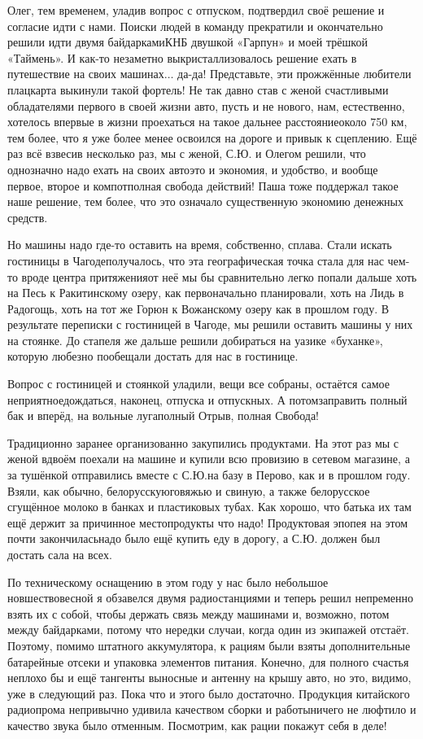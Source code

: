 Олег, тем временем, уладив вопрос с отпуском, подтвердил своё решение и согласие идти с нами. Поиски людей в команду прекратили и окончательно решили идти двумя байдарками\mdash КНБ двушкой «Гарпун» и моей трёшкой «Таймень». И как-то незаметно выкристаллизовалось решение ехать в путешествие на своих машинах$\ldots$ да-да! Представьте, эти прожжённые любители плацкарта выкинули такой фортель! Не так давно став с женой счастливыми обладателями первого в своей жизни авто, пусть и не нового, нам, естественно, хотелось впервые в жизни проехаться на такое дальнее расстояние\mdash около 750 км, тем более, что я уже более менее освоился на дороге и привык к сцеплению. Ещё раз всё взвесив несколько раз, мы с женой, С.Ю. и Олегом решили, что однозначно надо ехать на своих авто\mdash это и экономия, и удобство, и вообще первое, второе и компот\mdash полная свобода действий! Паша тоже поддержал такое наше решение, тем более, что это означало существенную экономию денежных средств. 

Но машины надо где-то оставить на время, собственно, сплава. Стали искать гостиницы в Чагоде\mdash получалось, что эта географическая точка стала для нас чем-то вроде центра притяжения\mdash от неё мы бы сравнительно легко попали дальше хоть на Песь к Ракитинскому озеру, как первоначально планировали, хоть на Лидь в Радогощь, хоть на тот же Горюн к Вожанскому озеру как в прошлом году. В результате переписки с гостиницей в Чагоде, мы решили оставить машины у них на стоянке. До стапеля же дальше решили добираться на уазике «буханке», которую любезно пообещали достать для нас в гостинице. 

Вопрос с гостиницей и стоянкой уладили, вещи все собраны, остаётся самое неприятное\mdash дождаться, наконец, отпуска и отпускных. А потом\mdash заправить полный бак и вперёд, на вольные луга\mdash полный Отрыв, полная Свобода! 

Традиционно заранее организованно закупились продуктами. На этот раз мы с женой вдвоём поехали на машине и купили всю провизию в сетевом магазине, а за тушёнкой отправились вместе с С.Ю.\mdash на базу в Перово, как и в прошлом году. Взяли, как обычно, белорусскую\mdash говяжью и свиную, а также белорусское сгущённое молоко в банках и пластиковых тубах. Как хорошо, что батька их там ещё держит за причинное место\mdash продукты что надо! Продуктовая эпопея на этом почти закончилась\mdash надо было ещё купить еду в дорогу, а С.Ю. должен был достать сала на всех.

По техническому оснащению в этом году у нас было небольшое новшество\mdash весной я обзавелся двумя радиостанциями и теперь решил непременно взять их с собой, чтобы держать связь между машинами и, возможно, потом между байдарками, потому что нередки случаи, когда один из экипажей отстаёт. Поэтому, помимо штатного аккумулятора, к рациям были взяты дополнительные батарейные отсеки и упаковка элементов питания. Конечно, для полного счастья неплохо бы и ещё тангенты выносные и антенну на крышу авто, но это, видимо, уже в следующий раз. Пока что и этого было достаточно. Продукция китайского радиопрома непривычно удивила качеством сборки и работы\mdash ничего не люфтило и качество звука было отменным. Посмотрим, как рации покажут себя в деле!

